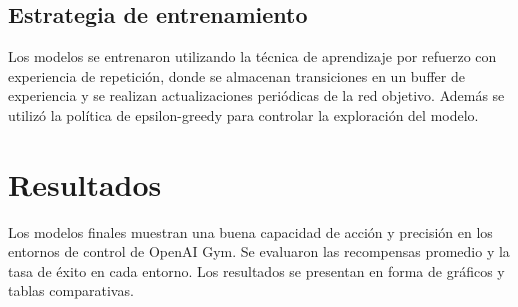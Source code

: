 \documentclass[a4paper,12pt]{article}
\begin{document}
\subsection{Estrategia de entrenamiento}
Los modelos se entrenaron utilizando la técnica de aprendizaje por refuerzo con experiencia de repetición, donde se almacenan transiciones en un buffer de experiencia y se realizan actualizaciones periódicas de la red objetivo. Además se utilizó la política de epsilon-greedy para controlar la exploración del modelo.

\section{Resultados}
Los modelos finales muestran una buena capacidad de acción y precisión en los entornos de control de OpenAI Gym. Se evaluaron las recompensas promedio y la tasa de éxito en cada entorno. Los resultados se presentan en forma de gráficos y tablas comparativas.
\end{document}
